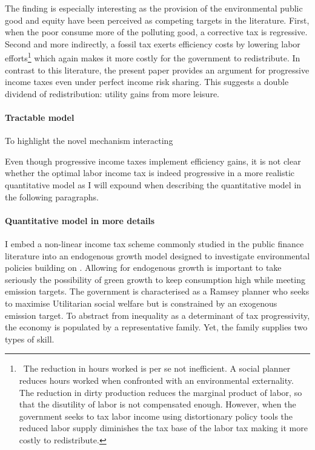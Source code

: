 The finding is especially interesting as the provision of the environmental public good and equity have been perceived as competing targets in the literature. First, when the poor consume more of the polluting good, a corrective tax is regressive. Second and more indirectly, a fossil tax exerts efficiency costs by lowering labor efforts\footnote{\ The reduction in hours worked is per se not inefficient. A social planner reduces hours worked when confronted with an environmental externality. The reduction in dirty production reduces the marginal product of labor, so that the disutility of labor is not compensated enough. However, when the government seeks to tax labor income using distortionary policy tools the reduced labor supply diminishes the tax base of the labor tax making it more costly to redistribute.} which again makes it more costly for the government to redistribute. 
In contrast to this literature, the present paper provides an argument for progressive income taxes even under perfect income risk sharing. This suggests a double dividend of redistribution: utility gains from more leisure.

\paragraph{Tractable model}
To highlight the novel mechanism interacting 

Even though progressive income taxes implement efficiency gains, it is not clear whether the optimal labor income tax is indeed progressive in a more realistic quantitative model as I will expound when describing the quantitative model in the following paragraphs. 

\paragraph{Quantitative model in more details}
I embed a non-linear income tax scheme commonly studied in the public finance literature \citep[e.g.][]{Heathcote2017OptimalFramework} into an endogenous growth model designed to investigate environmental policies building on \cite{Fried2018ClimateAnalysis}.  
Allowing for endogenous growth is important to take seriously the possibility of green growth to keep consumption high while meeting emission targets.
The government is characterised as a Ramsey planner who seeks to maximise Utilitarian social welfare but is constrained by an exogenous emission target. To abstract from inequality as a determinant of tax progressivity, the economy is populated by a representative family. Yet, the family supplies two types of skill. 

